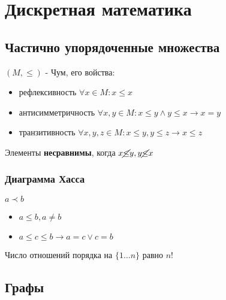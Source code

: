 \section{Дискретная математика}

\subsection{Частично упорядоченные множества}
$(M, \le )$ - Чум, его войства:
\begin{itemize}
	\item рефлексивность $\forall x \in M: x \le x$
	\item антисимметричность $\forall x,y \in M : x \le y \wedge y \le x \rightarrow x = y$
	\item транзитивность $\forall x,y,z \in M : x \le y, y \le z \rightarrow x \le z$
\end{itemize}
\vspace{1em}
Элементы \textbf{несравнимы}, когда $x \cancel{\le} y, y \cancel{\le} x$
\subsubsection{Диаграмма Хасса}
$a \prec b$
\begin{itemize}
	\item $a \le b, a \neq b$
	\item $a \le c \le b \rightarrow a =c \vee c = b$
\end{itemize}
Число отношений порядка на $\{1 \dots n\}$ равно $n!$ 
\subsection{Графы}
